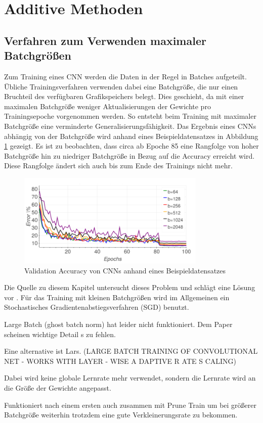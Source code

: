 \section{Additive Methoden}

\subsection{Verfahren zum Verwenden maximaler Batchgrößen}
\color{blue1}
Zum Training eines CNN werden die Daten in der Regel in Batches aufgeteilt. Übliche Trainingsverfahren verwenden dabei eine Batchgröße, die nur einen Bruchteil des verfügbaren Grafikspeichers belegt. Dies geschieht, da mit einer maximalen Batchgröße weniger Aktualisierungen der Gewichte pro Trainingsepoche vorgenommen werden. So entsteht beim Training mit maximaler Batchgröße eine verminderte Generalisierungsfähigkeit. Das Ergebnis eines CNNs abhängig von der Batchgröße wird anhand eines Beispieldatensatzes in Abbildung \ref{abb:largeB1} gezeigt. Es ist zu beobachten, dass circa ab Epoche 85 eine Rangfolge von hoher Batchgröße hin zu niedriger Batchgröße in Bezug auf die Accuracy erreicht wird. Diese Rangfolge ändert sich auch bis zum Ende des Trainings nicht mehr. 


\begin{figure}[h]
 \centering
 \includegraphics[width=0.8\textwidth]{KapitelPartA/images/batchSize1.png}
 \caption{Validation Accuracy von CNNs anhand eines Beispieldatensatzes}
 \label{abb:largeB1}
\end{figure}


Die Quelle zu diesem Kapitel untersucht dieses Problem und schlägt eine Lösung vor \cite{lars}.
Für das Training mit kleinen Batchgrößen wird im Allgemeinen ein Stochastisches Gradientenabstiegsverfahren (SGD) benutzt. 


Large Batch (ghost batch norm) hat leider nicht funktioniert. Dem Paper scheinen wichtige Detail s zu fehlen.

Eine alternative ist Lars. (LARGE BATCH TRAINING OF CONVOLUTIONAL NET -
WORKS WITH LAYER - WISE A DAPTIVE R ATE S CALING)

Dabei wird keine globale Lernrate mehr verwendet, sondern die Lernrate wird an die Größe der Gewichte angepasst. 

Funktioniert nach einem ersten auch zusammen mit Prune Train um bei größerer Batchgröße weiterhin trotzdem eine gute Verkleinerungsrate zu bekommen.
\color{black}
